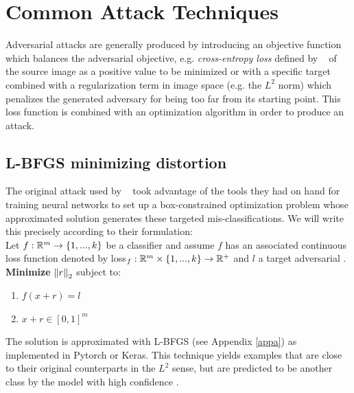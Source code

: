 \section{Common Attack Techniques}
Adversarial attacks are generally produced by introducing an objective
function which balances the adversarial objective, e.g. \emph{cross-entropy
loss} defined by ~\citet{good1963maximum} of the source image as a positive
value to be minimized or with a specific target combined with a
regularization term in image space (e.g. the $L^2$ norm) which
penalizes the generated adversary for being too far from its starting
point. This loss function is combined with an optimization algorithm
in order to produce an attack. 


\subsection{L-BFGS minimizing distortion}\label{lbfgs}

The original attack used by ~\citet{szegedy2013} took advantage of the
tools they had on  hand for training neural networks to set up a
box-constrained optimization problem whose approximated solution
generates these targeted mis-classifications. We will write this
precisely according to their formulation: \\

Let $f : \mathbb{R}^m \to \{1,...,k\}$ be a classifier and assume $f$ has an associated continuous loss function denoted by loss$_f : \mathbb{R}^m \times \{1,...,k\} \to \mathbb{R}^+$ and $l$ a target adversarial . \\
\textbf{ Minimize} $\left\Vert r \right\Vert_2$ subject to:
\begin{enumerate}[1.]
\item $f(x + r) = l$
\item $x + r \in [0,1]^m$
\end{enumerate}

The solution is approximated with L-BFGS (see Appendix \ref{appa}) as
implemented in Pytorch or Keras. This technique yields examples that
are close to their original counterparts in the $L^2$ sense, but are
predicted to be another class by the model with high confidence .  \\



